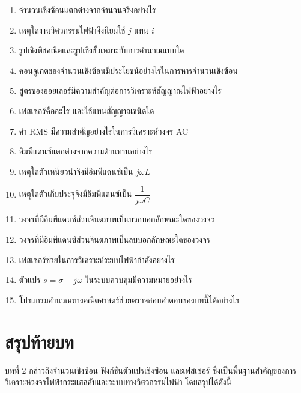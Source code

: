 \begin{enumerate}
\item จำนวนเชิงซ้อนแตกต่างจากจำนวนจริงอย่างไร
\item เหตุใดงานวิศวกรรมไฟฟ้าจึงนิยมใช้ $j$ แทน $i$
\item รูปเชิงพีชคณิตและรูปเชิงขั้วเหมาะกับการคำนวณแบบใด
\item คอนจูเกตของจำนวนเชิงซ้อนมีประโยชน์อย่างไรในการหารจำนวนเชิงซ้อน
\item สูตรของออยเลอร์มีความสำคัญต่อการวิเคราะห์สัญญาณไฟฟ้าอย่างไร
\item เฟสเซอร์คืออะไร และใช้แทนสัญญาณชนิดใด
\item ค่า RMS มีความสำคัญอย่างไรในการวิเคราะห์วงจร AC
\item อิมพีแดนซ์แตกต่างจากความต้านทานอย่างไร
\item เหตุใดตัวเหนี่ยวนำจึงมีอิมพีแดนซ์เป็น $j\omega L$
\item เหตุใดตัวเก็บประจุจึงมีอิมพีแดนซ์เป็น $\dfrac{1}{j\omega C}$
\item วงจรที่มีอิมพีแดนซ์ส่วนจินตภาพเป็นบวกบอกลักษณะใดของวงจร
\item วงจรที่มีอิมพีแดนซ์ส่วนจินตภาพเป็นลบบอกลักษณะใดของวงจร
\item เฟสเซอร์ช่วยในการวิเคราะห์ระบบไฟฟ้ากำลังอย่างไร
\item ตัวแปร $s=\sigma+j\omega$ ในระบบควบคุมมีความหมายอย่างไร
\item โปรแกรมคำนวณทางคณิตศาสตร์ช่วยตรวจสอบคำตอบของบทนี้ได้อย่างไร
\end{enumerate}

\section{สรุปท้ายบท}

บทที่ 2 กล่าวถึงจำนวนเชิงซ้อน ฟังก์ชันตัวแปรเชิงซ้อน และเฟสเซอร์ ซึ่งเป็นพื้นฐานสำคัญของการวิเคราะห์วงจรไฟฟ้ากระแสสลับและระบบทางวิศวกรรมไฟฟ้า โดยสรุปได้ดังนี้

